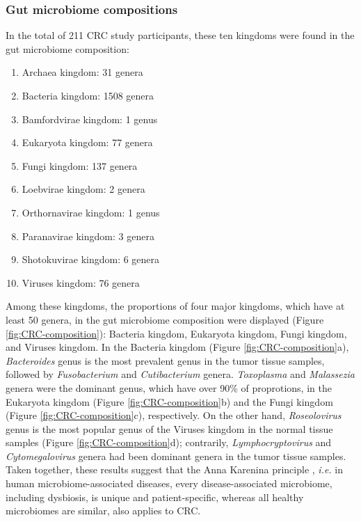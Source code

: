 \documentclass[11pt, a4paper, onecolumn, oneside]{report}
\begin{document}
            \subsubsection{Gut microbiome compositions}
                In the total of 211 CRC study participants, these ten kingdoms were found in the gut microbiome composition:
                \begin{enumerate}
                    \item Archaea kingdom: 31 genera
                    \item Bacteria kingdom: 1508 genera
                    \item Bamfordvirae kingdom: 1 genus
                    \item Eukaryota kingdom: 77 genera
                    \item Fungi kingdom: 137 genera
                    \item Loebvirae kingdom: 2 genera
                    \item Orthornavirae kingdom: 1 genus
                    \item Paranavirae kingdom: 3 genera
                    \item Shotokuvirae kingdom: 6 genera
                    \item Viruses kingdom: 76 genera
                \end{enumerate}

                Among these kingdoms, the proportions of four major kingdoms, which have at least 50 genera, in the gut microbiome composition were displayed (Figure \ref{fig:CRC-composition}): Bacteria kingdom, Eukaryota kingdom, Fungi kingdom, and Viruses kingdom. In the Bacteria kingdom (Figure \ref{fig:CRC-composition}a), \textit{Bacteroides} genus is the most prevalent genus in the tumor tissue samples, followed by \textit{Fusobacterium} and \textit{Cutibacterium} genera. \textit{Toxoplasma} and \textit{Malassezia} genera were the dominant genus, which have over 90\% of proprotions, in the Eukaryota kingdom (Figure \ref{fig:CRC-composition}b) and the Fungi kingdom (Figure \ref{fig:CRC-composition}c), respectively. On the other hand, \textit{Roseolovirus} genus is the most popular genus of the Viruses kingdom in the normal tissue samples (Figure \ref{fig:CRC-composition}d); contrarily, \textit{Lymphocryptovirus} and \textit{Cytomegalovirus} genera had been dominant genera in the tumor tissue samples. Taken together, these results suggest that the Anna Karenina principle \cite{Anna-1, Anna-2}, \textit{i.e.} in human microbiome-associated diseases, every disease-associated microbiome, including dysbiosis, is unique and patient-specific, whereas all healthy microbiomes are similar, also applies to CRC.
\end{document}
